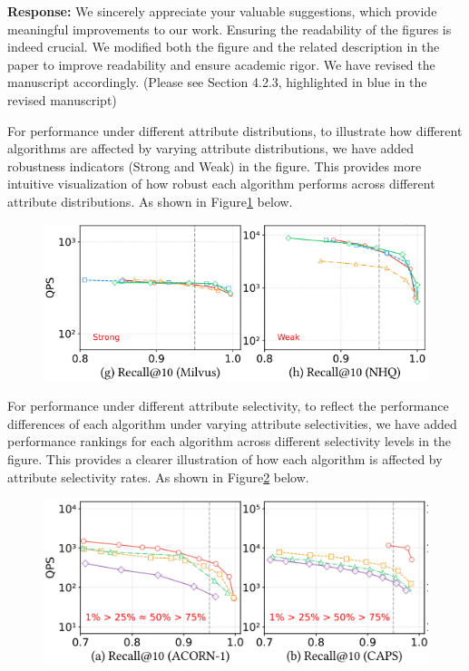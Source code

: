 \documentclass[sigconf, nonacm]{acmart}
\begin{document}
\noindent
\textbf{Response:} We sincerely appreciate your valuable suggestions, which provide meaningful improvements to our work. Ensuring the readability of the figures is indeed crucial. We modified both the figure and the related description in the paper to improve readability and ensure academic rigor. We have revised the manuscript accordingly. (Please see Section 4.2.3, highlighted in blue in the revised manuscript)

For performance under different attribute distributions, to illustrate how different algorithms are affected by varying attribute distributions, we have added robustness indicators (Strong and Weak) in the figure. This provides more intuitive visualization of how robust each algorithm performs across different attribute distributions. As shown in Figure\ref{fig:attribute_distribution} below.

\begin{figure}[htbp]
	\centering
	\includegraphics[width=\linewidth]{fig/attribute_distribution.png}
	\caption{}
	\label{fig:attribute_distribution}
\end{figure}

For performance under different attribute selectivity, to reflect the performance differences of each algorithm under varying attribute selectivities, we have added performance rankings for each algorithm across different selectivity levels in the figure. This provides a clearer illustration of how each algorithm is affected by attribute selectivity rates. As shown in Figure\ref{fig:attribute_selectivity} below.

\begin{figure}[htbp]
	\centering
	\includegraphics[width=\linewidth]{fig/attribute_selectivity.png}
	\caption{}
	\label{fig:attribute_selectivity}
\end{figure}
\end{document}
